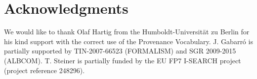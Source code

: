 \documentclass{acm_proc_article-sp}
\begin{document}

\section{Acknowledgments}\label{sec:acknowledgments}
We would like to thank Olaf Hartig from the Humboldt-Universit\"{a}t zu Berlin for his kind support with the correct use of the Provenance Vocabulary. J. Gabarr\'{o} is partially supported by TIN-2007-66523 (FORMALISM) and SGR 2009-2015 (ALBCOM). T. Steiner is partially funded by the EU FP7 I-SEARCH project (project reference 248296).

%

%
%
\pagebreak
\appendix
\end{document}

